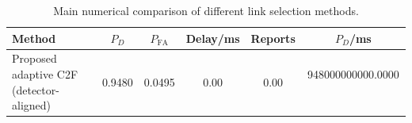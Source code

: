 \begin{table}[t]
    \centering
    \caption{Main numerical comparison of different link selection methods.}
    \label{tab:main_summary}
    \begin{tabular}{l c c c c c}
        \hline
        Method & $P_D$ & $P_{\mathrm{FA}}$ & Delay/ms & Reports & $P_D$/ms \\
        \hline
        Proposed adaptive C2F (detector-aligned) & 0.9480 & 0.0495 & 0.00 & 0.00 & 948000000000.0000 \
        \hline
    \end{tabular}
\end{table}
